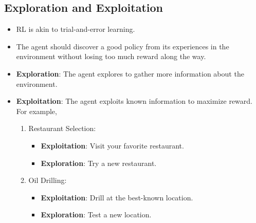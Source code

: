 \subsection{Exploration and Exploitation}
\begin{itemize}
    \item RL is akin to trial-and-error learning.
    \item The agent should discover a good policy from its experiences in the environment without losing too much reward along the way.
    \item \textbf{Exploration}: The agent explores to gather more information about the environment.
    \item \textbf{Exploitation}: The agent exploits known information to maximize reward. For example,
    \begin{enumerate}
        \item Restaurant Selection:
        \begin{itemize}
            \item \textbf{Exploitation}: Visit your favorite restaurant.
            \item \textbf{Exploration}: Try a new restaurant.
        \end{itemize}
        \item Oil Drilling:
        \begin{itemize}
            \item \textbf{Exploitation}: Drill at the best-known location.
            \item \textbf{Exploration}: Test a new location.
        \end{itemize}
    \end{enumerate}
\end{itemize}

